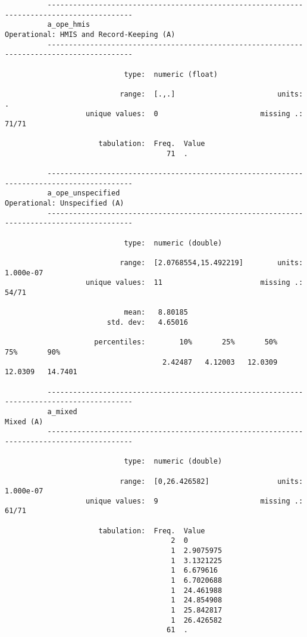 \documentclass{article}
\begin{document}
\begin{verbatim}
          ------------------------------------------------------------------------------------------
          a_ope_hmis                                        Operational: HMIS and Record-Keeping (A)
          ------------------------------------------------------------------------------------------
          
                            type:  numeric (float)
          
                           range:  [.,.]                        units:  .
                   unique values:  0                        missing .:  71/71
          
                      tabulation:  Freq.  Value
                                      71  .
          
          ------------------------------------------------------------------------------------------
          a_ope_unspecified                                             Operational: Unspecified (A)
          ------------------------------------------------------------------------------------------
          
                            type:  numeric (double)
          
                           range:  [2.0768554,15.492219]        units:  1.000e-07
                   unique values:  11                       missing .:  54/71
          
                            mean:   8.80185
                        std. dev:   4.65016
          
                     percentiles:        10%       25%       50%       75%       90%
                                     2.42487   4.12003   12.0309   12.0309   14.7401
          
          ------------------------------------------------------------------------------------------
          a_mixed                                                                          Mixed (A)
          ------------------------------------------------------------------------------------------
          
                            type:  numeric (double)
          
                           range:  [0,26.426582]                units:  1.000e-07
                   unique values:  9                        missing .:  61/71
          
                      tabulation:  Freq.  Value
                                       2  0
                                       1  2.9075975
                                       1  3.1321225
                                       1  6.679616
                                       1  6.7020688
                                       1  24.461988
                                       1  24.854908
                                       1  25.842817
                                       1  26.426582
                                      61  .
          

\end{verbatim}
\end{document}
